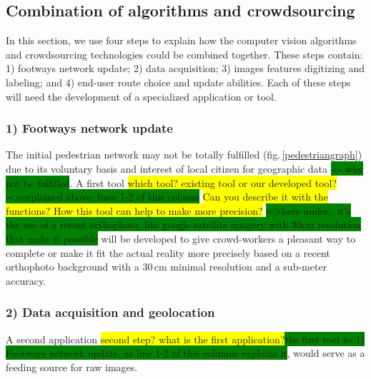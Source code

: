 \documentclass[10pt,conference,a4paper]{IEEEtran}
\begin{document}
\subsection{Combination of algorithms and crowdsourcing}

In this section, we use four steps to explain how the computer vision algorithms and crowdsourcing technologies could be combined together. These steps contain: 1) footways network update; 2) data acquisition; 3) images features digitizing and labeling; and 4) end-user route choice and update abilities. Each of these steps will need the development of a specialized application or tool.


\subsubsection*{1) Footways network update}
The initial pedestrian network  may not be totally fulfilled (fig.\,\ref{pedestriangraph}) due to its voluntary basis and interest of local citizen for geographic data \colorbox{green}{<- why not be fulfilled}. A first tool \colorbox{yellow}{which tool? existing tool or our developed tool? } 
\colorbox{green}{=>explained above, lines 1-2 of this column}
\colorbox{yellow}{Can you describe it with the functions? How this tool can help to make more precision?}
\colorbox{green}{=>here under:, it's the use of a recent orthophoto, like google satellite imagery with 30cm resolution that make it possible}
will be developed to give crowd-workers a pleasant way to complete or make it fit the actual reality more precisely based on a recent orthophoto background with a 30\,cm minimal resolution and a sub-meter accuracy. %


\subsubsection*{2) Data acquisition and geolocation}
A second application \colorbox{yellow}{second step? what is the first application?}\colorbox{green}{the first tool is: 1) Footways network update, as line 1-2 of this columns explains it}, %
would serve as a feeding source for raw images. 
\end{document}
